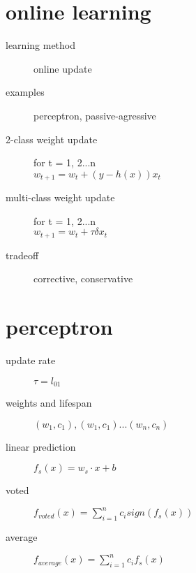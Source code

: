 \documentclass[12pt]{article}
\begin{document}
\begin{multicols}{2}
  \section{online learning}
  \begin{description}
  \item[learning method] online update
  \item[examples] perceptron, passive-agressive
  \item[2-class weight update]
    for t = 1, 2...n \\
    $w_{t+1} = w_{t} + (y-h(x)) x_{t}$
  \item[multi-class weight update]
    for t = 1, 2...n \\
    $w_{t+1} = w_{t} + \tau \delta x_t$
  \item[tradeoff] corrective, conservative
  \end{description}

  \section{perceptron}
  \begin{description}
    \item[update rate] $\tau = l_{01}$
    \item[weights and lifespan]  $(w_1, c_1), (w_1, c_1) ... (w_n, c_n)$
    \item[linear prediction] $f_s(x) = w_s \cdot x + b$
    \item[voted] $f_{voted}(x) = \sum_{i=1}^n c_i sign(f_s(x))$
    \item[average] $f_{average}(x) = \sum_{i=1}^n c_i f_s(x)$
  \end{description}


\end{multicols}
\end{document}
